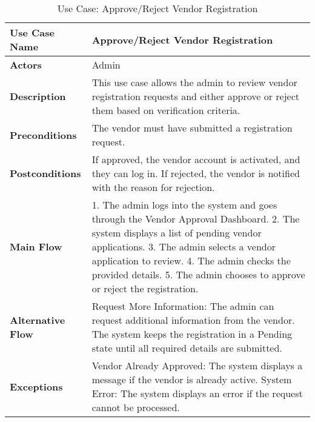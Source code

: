 \begin{table}[h]
\centering
\begin{tabular}{|p{3cm}|p{10cm}|}
\hline
\textbf{Use Case Name} & Approve/Reject Vendor Registration \\
\hline
\textbf{Actors} & Admin \\
\hline
\textbf{Description} & This use case allows the admin to review vendor registration requests and either approve or reject them based on verification criteria. \\
\hline
\textbf{Preconditions} & The vendor must have submitted a registration request. \\
\hline
\textbf{Postconditions} & If approved, the vendor account is activated, and they can log in. If rejected, the vendor is notified with the reason for rejection. \\
\hline
\textbf{Main Flow} & 1. The admin logs into the system and goes through the Vendor Approval Dashboard. 2. The system displays a list of pending vendor applications. 3. The admin selects a vendor application to review. 4. The admin checks the provided details. 5. The admin chooses to approve or reject the registration. \\
\hline
\textbf{Alternative Flow} & Request More Information: The admin can request additional information from the vendor. The system keeps the registration in a Pending state until all required details are submitted. \\
\hline
\textbf{Exceptions} & Vendor Already Approved: The system displays a message if the vendor is already active. System Error: The system displays an error if the request cannot be processed. \\
\hline
\end{tabular}
\caption{Use Case: Approve/Reject Vendor Registration}
\end{table}


